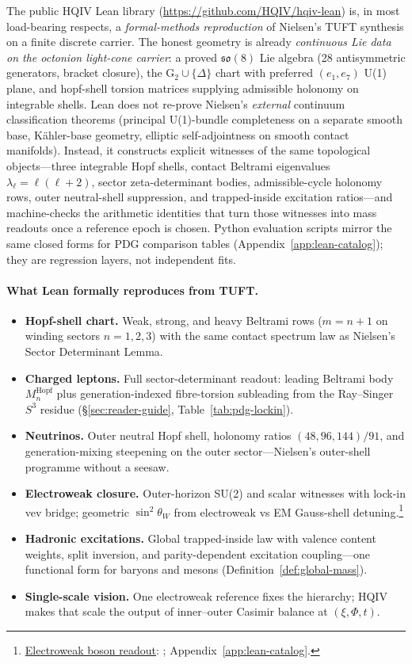 \documentclass[11pt]{amsart}
\newcommand{\leanrepo}{https://github.com/HQIV/hqiv-lean/blob/main}
\newcommand{\leanfile}[1]{\href{\leanrepo/#1}{\footnotesize\path{#1}}}
\newcommand{\leanfnterm}[3]{\footnote{\hyperref[#2]{#1}: \leanfile{#3}; Appendix~\ref{app:lean-catalog}.}}
\begin{document}
The public HQIV Lean library (\url{https://github.com/HQIV/hqiv-lean}) is, in most load-bearing respects, a \emph{formal-methods reproduction} of Nielsen's TUFT synthesis on a finite discrete carrier. The honest geometry is already \emph{continuous Lie data on the octonion light-cone carrier}: a proved $\mathfrak{so}(8)$ Lie algebra (28 antisymmetric generators, bracket closure), the G$_2\cup\{\Delta\}$ chart with preferred $(e_1,e_7)$ U(1) plane, and hopf-shell torsion matrices supplying admissible holonomy on integrable shells. Lean does not re-prove Nielsen's \emph{external} continuum classification theorems (principal U(1)-bundle completeness on a separate smooth base, Kähler-base geometry, elliptic self-adjointness on smooth contact manifolds). Instead, it constructs explicit witnesses of the same topological objects---three integrable Hopf shells, contact Beltrami eigenvalues $\lambda_\ell=\ell(\ell+2)$, sector zeta-determinant bodies, admissible-cycle holonomy rows, outer neutral-shell suppression, and trapped-inside excitation ratios---and machine-checks the arithmetic identities that turn those witnesses into mass readouts once a reference epoch is chosen. Python evaluation scripts mirror the same closed forms for PDG comparison tables (Appendix~\ref{app:lean-catalog}); they are regression layers, not independent fits.

\paragraph{What Lean formally reproduces from TUFT.}
\begin{itemize}[nosep]
\item \textbf{Hopf-shell chart.} Weak, strong, and heavy Beltrami rows ($m=n+1$ on winding sectors $n=1,2,3$) with the same contact spectrum law as Nielsen's Sector Determinant Lemma.
\item \textbf{Charged leptons.} Full sector-determinant readout: leading Beltrami body $M_n^{\mathrm{Hopf}}$ plus generation-indexed fibre-torsion subleading from the Ray--Singer $S^3$ residue (\S\ref{sec:reader-guide}, Table~\ref{tab:pdg-lockin}).
\item \textbf{Neutrinos.} Outer neutral Hopf shell, holonomy ratios $(48,96,144)/91$, and generation-mixing steepening on the outer sector---Nielsen's outer-shell programme without a seesaw.
\item \textbf{Electroweak closure.} Outer-horizon SU(2) and scalar witnesses with lock-in vev bridge; geometric $\sin^2\theta_W$ from electroweak vs EM Gauss-shell detuning.\leanfnterm{Electroweak boson readout}{lean:ew-boson-readout}{Hqiv/Physics/TuftElectroweakBosonReadout.lean}
\item \textbf{Hadronic excitations.} Global trapped-inside law with valence content weights, split inversion, and parity-dependent excitation coupling---one functional form for baryons and mesons (Definition~\ref{def:global-mass}).
\item \textbf{Single-scale vision.} One electroweak reference fixes the hierarchy; HQIV makes that scale the output of inner--outer Casimir balance at $(\xi,\Phi,t)$.
\end{itemize}
\end{document}
